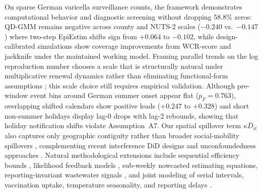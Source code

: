 On sparse German varicella surveillance counts, the framework demonstrates computational behavior
and diagnostic screening without dropping 58.8\% zeros: QD-GMM remains negative across county and
NUTS-2 scales ($-0.240$ vs.\ $-0.147$) where two-step EpiEstim shifts sign from $+0.064$ to
$-0.102$, while design-calibrated simulations show coverage improvements from WCR-score and
jackknife under the maintained working model. Framing parallel trends on the log reproduction number
chooses a scale that is structurally natural under multiplicative renewal dynamics rather than
eliminating functional-form assumptions \citep{roth2023parallel}; this scale choice still requires
empirical validation. Although pre-window event bins around German summer onset appear flat
($p_F=0.763$), overlapping shifted calendars show positive leads ($+0.247$ to $+0.328$) and short
non-summer holidays display lag-0 drops with lag-2 rebounds, showing that holiday notification shifts
violate Assumption~A7. Our spatial spillover term $\kappa\bar D_{it}$ also captures only geographic
contiguity rather than broader social-mobility spillovers \citep{zhao2021interdependent},
complementing recent interference DiD designs \citep{hettinger2025doubly,elenev2025staggered,xu2023did,xu2026dynamic}
and unconfoundedness approaches \citep{callaway2023pandemic}. Natural methodological extensions
include sequential efficiency bounds \citep{chamberlain1992sequential,chamberlain2022feedback},
likelihood feedback models \citep{bonhomme2025feedback}, sub-weekly nowcasted estimating equations,
reporting-invariant wastewater signals \citep{goldstein2024wastewater}, and joint modeling of
serial intervals, vaccination uptake, temperature seasonality, and reporting delays
\citep{siedler2010varicella,rieck2020impfquoten,suzuki2023varicella,trevisin2023spatially,goldwasser2026rt}.
